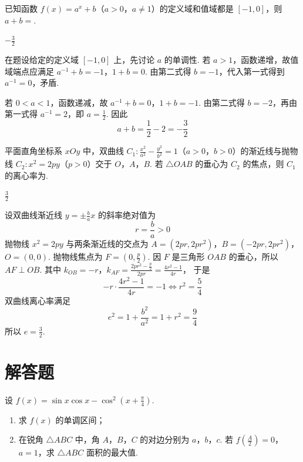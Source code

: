 \begin{problem}
已知函数 \(f(x) = a^x + b\)（\(a > 0\)，\(a \neq 1\)）的定义域和值域都是 \([-1,0]\)，则 \(a + b =\)\fillinblank{}.
\end{problem}

\begin{answer}
\(-\frac{3}{2}\)
\end{answer}

\begin{solution}
在题设给定的定义域 \([-1,0]\) 上，先讨论 \(a\) 的单调性.
若 \(a>1\)，函数递增，故值域端点应满足
\(a^{-1}+b=-1\)，\(1+b=0\).
由第二式得 \(b=-1\)，代入第一式得到 \(a^{-1}=0\)，矛盾.

若 \(0<a<1\)，函数递减，故
\(a^{-1}+b=0\)，\(1+b=-1\).
由第二式得 \(b=-2\)，再由第一式得 \(a^{-1}=2\)，即 \(a=\frac12\). 因此
\[
a+b=\frac12-2=-\frac32
\]
\end{solution}

\begin{problem}
平面直角坐标系 \(xOy\) 中，双曲线 \(C_1: \frac{x^2}{a^2} - \frac{y^2}{b^2} = 1\)（\(a > 0\)，\(b > 0\)）的渐近线与抛物线 \(C_2: x^2 = 2py\)（\(p > 0\)）交于 \(O\)，\(A\)，\(B\). 若 \(\triangle OAB\) 的垂心为 \(C_2\) 的焦点，则 \(C_1\) 的离心率为\fillinblank{}.
\end{problem}

\begin{answer}
\(\frac{3}{2}\)
\end{answer}

\begin{solution}
设双曲线渐近线 \(y=\pm\frac ba x\) 的斜率绝对值为
\[
r=\frac ba>0
\]
抛物线 \(x^2=2py\) 与两条渐近线的交点为
\(A=(2pr,2pr^2)\)，\(B=(-2pr,2pr^2)\)，\(O=(0,0)\).
抛物线焦点为 \(F=(0,\frac{p}{2})\). 因 \(F\) 是三角形 \(OAB\) 的垂心，所以 \(AF\perp OB\). 其中
\(k_{OB}=-r\)，\(k_{AF}=\frac{2pr^2-\frac{p}{2}}{2pr}=\frac{4r^2-1}{4r}\)，
于是
\[
-r\cdot\frac{4r^2-1}{4r}=-1
\iff r^2=\frac54
\]
双曲线离心率满足
\[
e^2=1+\frac{b^2}{a^2}=1+r^2=\frac94
\]
所以 \(e=\frac32\).
\end{solution}

\section{解答题}

\begin{problem}
设 \(f(x) = \sin x \cos x - \cos^2\left(x + \frac{\pi}{4}\right)\).
\begin{enumerate}
\item 求 \(f(x)\) 的单调区间；
\item 在锐角 \(\triangle ABC\) 中，角 \(A\)，\(B\)，\(C\) 的对边分别为 \(a\)，\(b\)，\(c\). 若 \(f\left(\frac{A}{2}\right) = 0\)，\(a = 1\)，求 \(\triangle ABC\) 面积的最大值.
\end{enumerate}
\end{problem}

